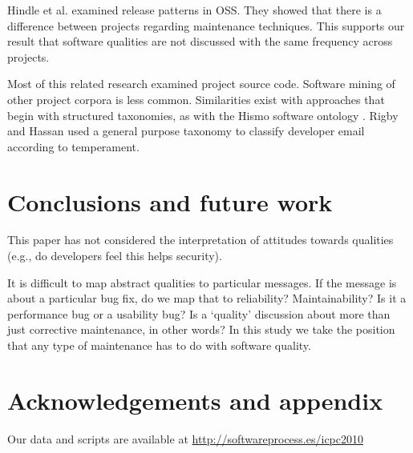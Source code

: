 \documentclass{acm_proc_article-sp}
\begin{document}
Hindle et al. \cite{Hindle2007} examined release patterns in OSS. They showed that there is a difference between projects regarding maintenance techniques. This supports our result that software qualities are not discussed with the same frequency across projects.

Most of this related research examined project source code. Software mining of other project corpora is less common. Similarities exist with approaches that begin with structured taxonomies, as with the Hismo software ontology \cite{girba06}. Rigby and Hassan \cite{rigby07msr} used a general purpose taxonomy to classify developer email according to temperament.

\section{Conclusions and future work}

%



This paper has not considered the interpretation of attitudes towards qualities (e.g., do developers feel this helps security).

It is difficult to map abstract qualities to particular messages. If the message is about a particular bug fix, do we map that to reliability? Maintainability? Is it a performance bug or a usability bug? Is a `quality' discussion about more than just corrective maintenance, in other words? In this study we take the position that any type of maintenance has to do with software quality.

\section{Acknowledgements and appendix}
Our data and scripts are available at \url{http://softwareprocess.es/icpc2010}



\end{document}
